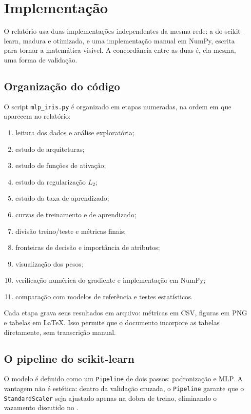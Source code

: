 ﻿%
\section{Implementação}
\label{sec:impl}

O relatório usa duas implementações independentes da mesma rede: a do scikit-learn, madura e
otimizada, e uma implementação manual em NumPy, escrita para tornar a matemática visível. A
concordância entre as duas é, ela mesma, uma forma de validação.

\subsection{Organização do código}

O script \texttt{mlp\_iris.py} é organizado em etapas numeradas, na ordem em que aparecem no
relatório:

\begin{enumerate}
	\item leitura dos dados e análise exploratória;
	\item estudo de arquiteturas;
	\item estudo de funções de ativação;
	\item estudo da regularização $L_2$;
	\item estudo da taxa de aprendizado;
	\item curvas de treinamento e de aprendizado;
	\item divisão treino/teste e métricas finais;
	\item fronteiras de decisão e importância de atributos;
	\item visualização dos pesos;
	\item verificação numérica do gradiente e implementação em NumPy;
	\item comparação com modelos de referência e testes estatísticos.
\end{enumerate}

Cada etapa grava seus resultados em arquivo: métricas em CSV, figuras em PNG e tabelas em LaTeX.
Isso permite que o documento incorpore as tabelas diretamente, sem transcrição manual.

\subsection{O pipeline do scikit-learn}

O modelo é definido como um \texttt{Pipeline} de dois passos: padronização e MLP. A vantagem não é
estética: dentro da validação cruzada, o \texttt{Pipeline} garante que o \texttt{StandardScaler}
seja ajustado apenas na dobra de treino, eliminando o vazamento discutido no
.

